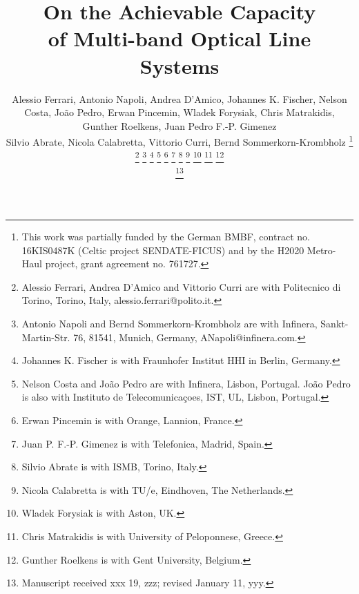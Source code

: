 \documentclass[journal]{IEEEtran}
\begin{document}
%
\title{On the Achievable Capacity\\ of Multi-band Optical Line Systems}
%
%
%
\author{Alessio Ferrari, Antonio Napoli, Andrea D'Amico, Johannes K. Fischer, Nelson Costa, Jo\~ao Pedro, Erwan Pincemin, Wladek Forysiak, Chris Matrakidis, Gunther Roelkens, Juan Pedro F.-P. Gimenez\\ Silvio Abrate, Nicola Calabretta, Vittorio Curri, Bernd Sommerkorn-Krombholz
\thanks{This work was partially funded by the German BMBF, contract no. 16KIS0487K (Celtic project SENDATE-FICUS) and by the H2020 Metro-Haul project, grant agreement no. 761727.}
\thanks{Alessio Ferrari, Andrea D'Amico and Vittorio Curri are with Politecnico di Torino, Torino, Italy, alessio.ferrari@polito.it.}
\thanks{Antonio Napoli and Bernd Sommerkorn-Krombholz are with Infinera, Sankt-Martin-Str. 76, 81541, Munich, Germany, ANapoli@infinera.com.}
\thanks{Johannes K. Fischer is with Fraunhofer Institut HHI in Berlin, Germany.}
\thanks{Nelson Costa and Jo\~ao Pedro are with Infinera, Lisbon, Portugal. Jo\~ao Pedro is also with Instituto de Telecomunica\c{c}{o}es, IST, UL, Lisbon, Portugal.}
\thanks{Erwan Pincemin is with Orange, Lannion, France.}
\thanks{Juan P. F.-P. Gimenez is with Telefonica, Madrid, Spain.}
\thanks{Silvio Abrate is with ISMB, Torino, Italy.}
\thanks{Nicola Calabretta is with TU/e, Eindhoven, The Netherlands.}
\thanks{Wladek Forysiak is with Aston, UK.}
\thanks{Chris Matrakidis is with University of Peloponnese, Greece.}
\thanks{Gunther Roelkens is with Gent University, Belgium.}

\thanks{Manuscript received xxx 19, zzz; revised January 11, yyy.}}
%
%
\end{document}
